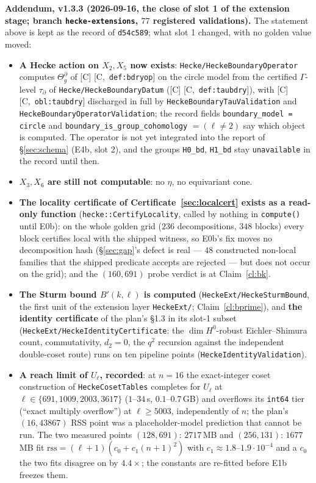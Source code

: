 \documentclass[11pt]{article}
\theoremstyle{remark}
\newcommand{\HA}[1]{[C,~\texttt{#1}]}      %
\begin{document}
\noindent\textbf{Addendum, v1.3.3 (2026-09-16, the close of slot 1 of the extension stage;
branch \texttt{hecke-extensions}, $77$ registered validations).} The statement above is kept as
the record of \texttt{d54c589}; what slot 1 changed, with no golden value moved:
\begin{itemize}
\item \textbf{A Hecke action on $X_2,X_5$ now exists}: \texttt{Hecke/HeckeBoundaryOperator}
  computes $\Theta^\partial_g$ of [C] \HA{def:bdryop} on the circle model from the certified
  $\Gamma$-level $\tau_\partial$ of \texttt{Hecke/HeckeBoundaryDatum} ([C] \HA{def:taubdry}),
  with [C] \HA{obl:taubdry} discharged in full by \texttt{HeckeBoundaryTauValidation} and
  \texttt{HeckeBoundaryOperatorValidation}; the record fields \texttt{boundary\_model = circle}
  and \texttt{boundary\_is\_group\_cohomology} $=(\ell\ne2)$ say which object is computed. The
  operator is not yet integrated into the report of \S\ref{sec:schema} (E4b, slot 2), and the
  groups \texttt{H0\_bd}, \texttt{H1\_bd} stay \texttt{unavailable} in the record until then.
\item \textbf{$X_3,X_6$ are still not computable}: no $\eta$, no equivariant cone.
\item \textbf{The locality certificate of Certificate~\ref{sec:localcert} exists as a read-only
  function} (\texttt{hecke::CertifyLocality}, called by nothing in \texttt{compute()} until E0b):
  on the whole golden grid ($236$ decompositions, $348$ blocks) every block certifies local with
  the shipped witness, so E0b's fix moves no decomposition hash (\S\ref{sec:gap}'s defect is
  real --- $48$ constructed non-local families that the shipped predicate accepts are rejected
  --- but does not occur on the grid); and the $(160,691)$ probe verdict is at Claim~\ref{cl:bk}.
\item \textbf{The Sturm bound $B'(k,\ell)$ is computed} (\texttt{HeckeExt/HeckeSturmBound}, the
  first unit of the extension layer \texttt{HeckeExt/}; Claim~\ref{cl:bprime}), and
  \textbf{the identity certificate} of the plan's \S1.3 in its slot-1 subset
  (\texttt{HeckeExt/HeckeIdentityCertificate}: the $\dim H^0$-robust Eichler--Shimura count,
  commutativity, $d_2=0$, the $q^2$ recursion against the independent double-coset route) runs
  on ten pipeline points (\texttt{HeckeIdentityValidation}).
\item \textbf{A reach limit of $U_\ell$, recorded}: at $n=16$ the exact-integer coset
  construction of \texttt{HeckeCosetTables} completes for $U_\ell$ at
  $\ell\in\{691,1009,2003,3617\}$ ($1$--$34$\,s, $0.1$--$0.7$\,GB) and overflows its
  \texttt{int64} tier (``exact multiply overflow'') at $\ell\ge5003$, independently of $n$; the
  plan's $(16,43867)$ RSS point was a placeholder-model prediction that cannot be run. The two
  measured points $(128,691)$: $2717$\,MB and $(256,131)$: $1677$\,MB fit
  $\mathrm{rss}=(\ell+1)(c_0+c_1(n+1)^2)$ with $c_1\approx1.8$--$1.9\cdot10^{-4}$ and a $c_0$
  the two fits disagree on by $4.4\times$; the constants are re-fitted before E1b freezes them.
\end{itemize}
\end{document}
